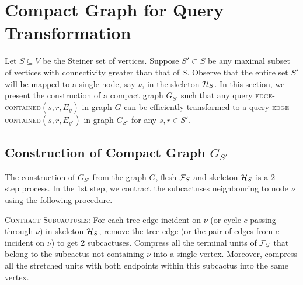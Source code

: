 \chapter{Compact Graph for Query Transformation}
\label{sec:compact-graph-section}
Let $S\subseteq V$ be the Steiner set of vertices. Suppose $S'\subset S$ be any maximal subset of vertices with connectivity greater than that of $S$.  Observe that the entire set $S'$ will be mapped to a single node, say $\nu$, in the skeleton ${\cal H}_S$. In this section, we present the construction of a compact graph $G_{S'}$ such that any query \textsc{edge-contained}$(s,r,E_y)$ in graph $G$ can be efficiently transformed to a query \textsc{edge-contained}$(s,r,E_{y'})$ in graph $G_{S'}$ for any $s,r\in S'$.
\vspace{-2mm}
\section{Construction of Compact Graph \texorpdfstring{$G_{S'}$}{}}\label{sec:compact-graph}


The construction of $G_{S'}$ from the graph $G$, flesh ${\cal F}_S$ and skeleton ${\cal H}_S$ is a $2-$step process. In the 1st step, we contract the subcactuses neighbouring to node $\nu$ using the following procedure.

{\textsc{Contract-Subcactuses}}: For each tree-edge incident on $\nu$ (or cycle $c$ passing through $\nu$) in skeleton ${\cal H}_S$, remove the tree-edge (or the pair of edges from $c$ incident on $\nu$) to get 2 subcactuses. Compress all the terminal units of ${\cal F}_S$ that belong to the subcactus not containing $\nu$ into a single vertex. Moreover, compress all the stretched units with both endpoints within this subcactus into the same vertex.

